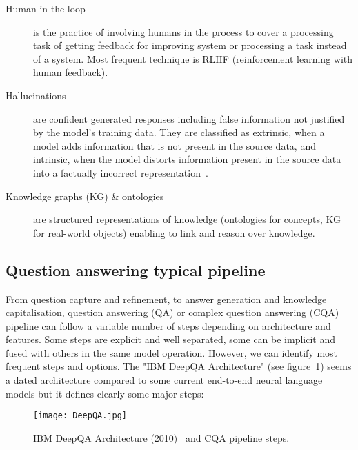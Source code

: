 \documentclass[acmsmall]{acmart}
\begin{document}
\begin{description}
\item [Human-in-the-loop] is the practice of involving humans in the process to cover a processing task of getting feedback for improving system or processing a task instead of a system. Most frequent technique is RLHF (reinforcement learning with human feedback).
\item [Hallucinations] are confident generated responses including false information not justified by the model's training data. They are classified as extrinsic, when a model adds information that is not present in the source data, and intrinsic, when the model distorts information present in the source data into a factually incorrect representation~\citep{choubeyCaPEContrastiveParameter2022}.
\item [Knowledge graphs (KG) \& ontologies] are structured representations of knowledge (ontologies for concepts, KG for real-world objects) enabling to link and reason over knowledge.
\end{description}

\subsection{Question answering typical pipeline}
From question capture and refinement, to answer generation and knowledge capitalisation, question answering (QA) or complex question answering (CQA) pipeline can follow a variable number of steps depending on architecture and features. Some steps are explicit and well separated, some can be implicit and fused with others in the same model operation. However, we can identify most frequent steps and options. The "IBM DeepQA Architecture" (see figure~\ref{DeepQA Architecture}) seems a dated architecture compared to some current end-to-end neural language models but it defines clearly some major steps:
\begin{figure}
\texttt{[image: DeepQA.jpg]}
\caption{IBM DeepQA Architecture (2010)~\citep{ferrucciBuildingWatsonOverview2010} and CQA pipeline steps.}
\label{DeepQA Architecture}
\end{figure}
\end{document}
